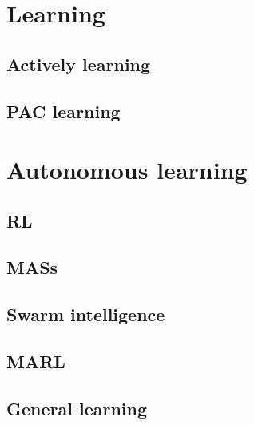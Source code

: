 \section{Learning}\label{sec:learning}

\subsection{Actively learning}\label{subsec:actively-learning}

\subsection{\Acl{PAC} learning}\label{subsec:pac-learning}

\section{Autonomous learning}\label{sec:autonomous-learning}

\subsection{\Acl{RL}}\label{subsec:rl}

\subsection{\Aclp{MAS}}\label{subsec:mas}

\subsection{Swarm intelligence}\label{subsec:swarm-intelligence}

\subsection{\Acl{MARL}}\label{subsec:marl}

\subsection{General learning}\label{subsec:general-learning}
